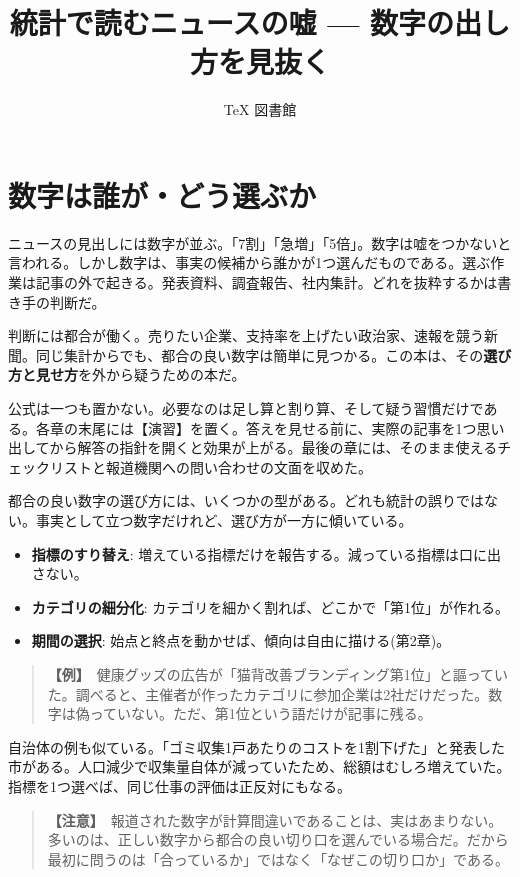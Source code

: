 \documentclass{article}
\title{統計で読むニュースの嘘 — 数字の出し方を見抜く}
\author{TeX 図書館}
\begin{document}
\section{数字は誰が・どう選ぶか}

ニュースの見出しには数字が並ぶ。「7割」「急増」「5倍」。数字は嘘をつかないと言われる。しかし数字は、事実の候補から誰かが1つ選んだものである。選ぶ作業は記事の外で起きる。発表資料、調査報告、社内集計。どれを抜粋するかは書き手の判断だ。

判断には都合が働く。売りたい企業、支持率を上げたい政治家、速報を競う新聞。同じ集計からでも、都合の良い数字は簡単に見つかる。この本は、その\textbf{選び方と見せ方}を外から疑うための本だ。

公式は一つも置かない。必要なのは足し算と割り算、そして疑う習慣だけである。各章の末尾には【演習】を置く。答えを見せる前に、実際の記事を1つ思い出してから解答の指針を開くと効果が上がる。最後の章には、そのまま使えるチェックリストと報道機関への問い合わせの文面を収めた。

都合の良い数字の選び方には、いくつかの型がある。どれも統計の誤りではない。事実として立つ数字だけれど、選び方が一方に傾いている。

\begin{itemize}
\item \textbf{指標のすり替え}: 増えている指標だけを報告する。減っている指標は口に出さない。
\item \textbf{カテゴリの細分化}: カテゴリを細かく割れば、どこかで「第1位」が作れる。
\item \textbf{期間の選択}: 始点と終点を動かせば、傾向は自由に描ける(第2章)。
\end{itemize}

\begin{quote}
\textbf{【例】}\ 健康グッズの広告が「猫背改善ブランディング第1位」と謳っていた。調べると、主催者が作ったカテゴリに参加企業は2社だけだった。数字は偽っていない。ただ、第1位という語だけが記事に残る。
\end{quote}

自治体の例も似ている。「ゴミ収集1戸あたりのコストを1割下げた」と発表した市がある。人口減少で収集量自体が減っていたため、総額はむしろ増えていた。指標を1つ選べば、同じ仕事の評価は正反対にもなる。

\begin{quote}
\textbf{【注意】}\ 報道された数字が計算間違いであることは、実はあまりない。多いのは、正しい数字から都合の良い切り口を選んでいる場合だ。だから最初に問うのは「合っているか」ではなく「なぜこの切り口か」である。
\end{quote}
\end{document}
